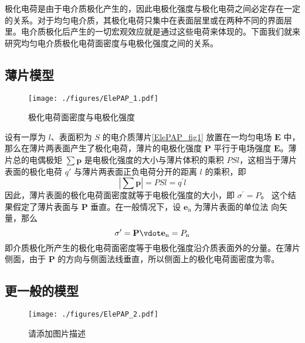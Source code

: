 
\begin{issues}
\end{issues}


极化电荷是由于电介质极化产生的，因此电极化强度与极化电荷之间必定存在一定的关系。对于均匀电介质，其极化电荷只集中在表面层里或在两种不同的界面层里。电介质极化后产生的一切宏观效应就是通过这些电荷来体现的。下面我们就来研究均匀电介质极化电荷面密度与电极化强度之间的关系。

\subsection{薄片模型}
\begin{figure}[ht]
\centering
\texttt{[image: ./figures/ElePAP\_1.pdf]}
\caption{极化电荷面密度与电极化强度} \label{ElePAP_fig1}
\end{figure}
设有一厚为 $l$、表面积为 $S $ 的电介质薄片\autoref{ElePAP_fig1} 放置在一均匀电场 $\mathbf E $ 中，那么在薄片两表面产生了极化电荷，薄片的电极化强度 $\mathbf P $ 平行于电场强度 $\mathbf E$。薄片总的电偶极矩 $\sum \mathbf p$ 是电极化强度的大小与薄片体积的乘积 $PSl$，这相当于薄片表面的极化电荷 $q' $ 与薄片两表面正负电荷分开的距离 $l $ 的乘积，即
\begin{equation}
\left|\sum \mathbf p\right|=P S l=q^{\prime} l
\end{equation}
因此，薄片表面的极化电荷面密度就等于电极化强度的大小，即 $\sigma^{\prime}=P$。
这个结果假定了薄片表面与 $\mathbf P $ 垂直。在一般情况下，设 $\mathbf e_\mathrm{n} $ 为薄片表面的单位法
向矢量，那么
\begin{equation}
\sigma^{\prime}=\mathbf P \vdot \mathbf e_{\mathrm{n}}=P_{\mathrm{n}}
\end{equation}
即介质极化所产生的极化电荷面密度等于电极化强度沿介质表面外的分量。在薄片侧面，由于 $\mathbf P $ 的方向与侧面法线垂直，所以侧面上的极化电荷面密度为零。

\subsection{更一般的模型}
\begin{figure}[ht]
\centering
\texttt{[image: ./figures/ElePAP\_2.pdf]}
\caption{请添加图片描述} \label{ElePAP_fig2}
\end{figure}

